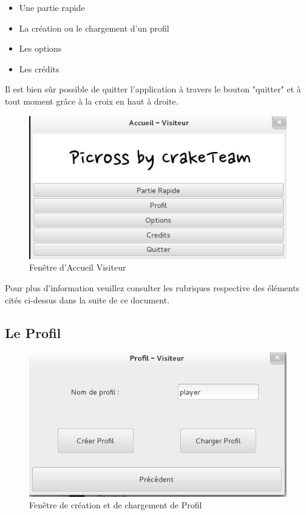 \documentclass[11pt]{article}
\begin{document}
	\begin{itemize}
		\item Une partie rapide
		\item La création ou le chargement d'un profil
		\item Les options
		\item Les crédits
	\end{itemize}

Il est bien sûr possible de quitter l'application à travers le bouton "quitter" et à tout moment grâce à la croix en haut à droite.

	\begin{figure}[!ht]
		\centering
		\includegraphics{./Screenshot/AccueilVisiteur.png}
		\caption{Fenêtre d'Accueil Visiteur}
	\end{figure}

Pour plus d'information veuillez consulter les rubriques respective des éléments cités ci-dessus dans la suite de ce document.

\subsection{Le Profil}

	\begin{figure}[!ht]
		\centering
		\includegraphics{./Screenshot/Profil.png}
		\caption{Fenêtre de création et de chargement de Profil}
	\end{figure}
\end{document}
